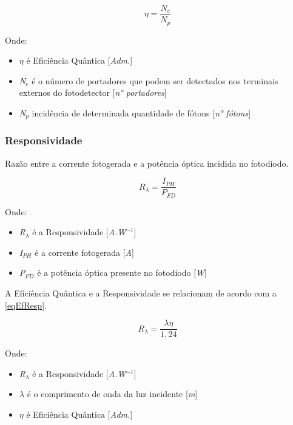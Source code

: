 \begin{equation}
    \eta = \frac{N_e}{N_p}
\end{equation}

Onde:
\begin{itemize}
    \item \textit{$\eta$} \'e Efici\^encia Qu\^antica [\textit{Adm.}]
    \item \textit{N$_e$} \'e o n\'umero de portadores que podem ser detectados nos terminais externos do fotodetector [\textit{n° portadores}]
    \item \textit{N$_p$} incid\^encia de determinada quantidade de f\'otons [\textit{n° f\'otons}]
\end{itemize}

\subsubsection{Responsividade}
Razão entre a corrente fotogerada e a potência óptica incidida no fotodiodo.

\begin{equation}
    \label{eq_responsividade}
    R_\lambda = \frac{I_{PH}}{P_{FD}}
\end{equation}

Onde:
\begin{itemize}
    \item \textit{R$_\lambda$} \'e a Responsividade [\textit{A.W$^{-1}$}]
    \item \textit{I$_{PH}$} \'e a corrente fotogerada [\textit{A}]
    \item \textit{P$_{FD}$} \'e a potência \'optica presente no fotodiodo [\textit{W}]
\end{itemize}

A Eficiência Quântica e a Responsividade se relacionam de acordo com a \autoref{eqEfResp}.

\begin{equation}
    \label{eqEfResp}
    R_\lambda = \frac{\lambda\eta}{1,24}
\end{equation}

Onde:
\begin{itemize}
    \item \textit{R$_\lambda$} \'e a Responsividade [\textit{A.W$^{-1}$}]
    \item $\lambda$ \'e o comprimento de onda da luz incidente [\textit{m}]
    \item $\eta$ \'e Efici\^encia Qu\^antica [\textit{Adm.}]
\end{itemize}

